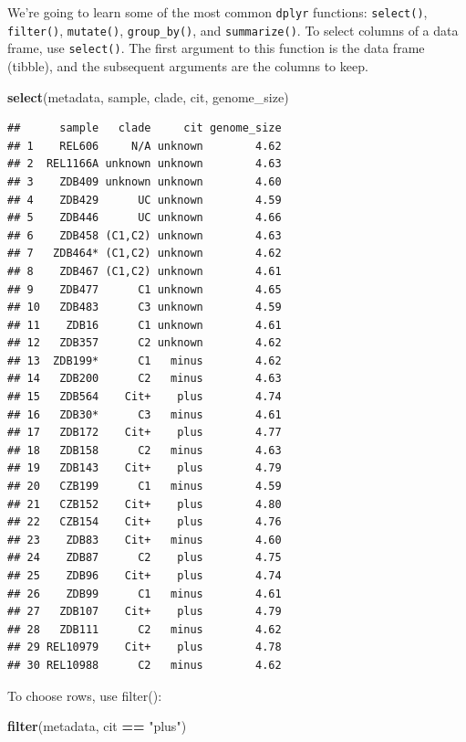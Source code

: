 \documentclass[]{book}
\newenvironment{Shaded}{\begin{snugshade}}{\end{snugshade}}
\newcommand{\KeywordTok}[1]{\textcolor[rgb]{0.13,0.29,0.53}{\textbf{#1}}}
\newcommand{\NormalTok}[1]{#1}
\newcommand{\OperatorTok}[1]{\textcolor[rgb]{0.81,0.36,0.00}{\textbf{#1}}}
\newcommand{\StringTok}[1]{\textcolor[rgb]{0.31,0.60,0.02}{#1}}
\begin{document}
We're going to learn some of the most common \texttt{dplyr} functions: \texttt{select()}, \texttt{filter()}, \texttt{mutate()}, \texttt{group\_by()}, and \texttt{summarize()}. To select columns of a data frame, use \texttt{select()}. The first argument to this function is the data frame (tibble), and the subsequent arguments are the columns to keep.

\begin{Shaded}
\begin{Highlighting}[]
\KeywordTok{select}\NormalTok{(metadata, sample, clade, cit, genome_size)}
\end{Highlighting}
\end{Shaded}

\begin{verbatim}
##      sample   clade     cit genome_size
## 1    REL606     N/A unknown        4.62
## 2  REL1166A unknown unknown        4.63
## 3    ZDB409 unknown unknown        4.60
## 4    ZDB429      UC unknown        4.59
## 5    ZDB446      UC unknown        4.66
## 6    ZDB458 (C1,C2) unknown        4.63
## 7   ZDB464* (C1,C2) unknown        4.62
## 8    ZDB467 (C1,C2) unknown        4.61
## 9    ZDB477      C1 unknown        4.65
## 10   ZDB483      C3 unknown        4.59
## 11    ZDB16      C1 unknown        4.61
## 12   ZDB357      C2 unknown        4.62
## 13  ZDB199*      C1   minus        4.62
## 14   ZDB200      C2   minus        4.63
## 15   ZDB564    Cit+    plus        4.74
## 16   ZDB30*      C3   minus        4.61
## 17   ZDB172    Cit+    plus        4.77
## 18   ZDB158      C2   minus        4.63
## 19   ZDB143    Cit+    plus        4.79
## 20   CZB199      C1   minus        4.59
## 21   CZB152    Cit+    plus        4.80
## 22   CZB154    Cit+    plus        4.76
## 23    ZDB83    Cit+   minus        4.60
## 24    ZDB87      C2    plus        4.75
## 25    ZDB96    Cit+    plus        4.74
## 26    ZDB99      C1   minus        4.61
## 27   ZDB107    Cit+    plus        4.79
## 28   ZDB111      C2   minus        4.62
## 29 REL10979    Cit+    plus        4.78
## 30 REL10988      C2   minus        4.62
\end{verbatim}

To choose rows, use filter():

\begin{Shaded}
\begin{Highlighting}[]
\KeywordTok{filter}\NormalTok{(metadata, cit }\OperatorTok{==}\StringTok{ "plus"}\NormalTok{)}
\end{Highlighting}
\end{Shaded}
\end{document}
